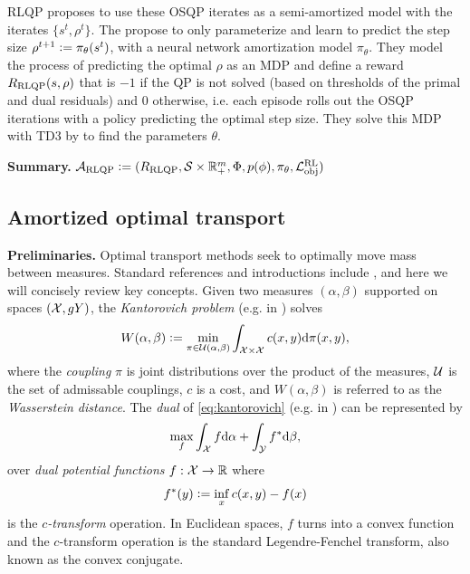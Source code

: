 \documentclass[twoside,11pt]{article}
\newcommand{\eg}{e.g.\xspace}
\newcommand{\ie}{i.e.\xspace}
\begin{document}
RLQP proposes to use these OSQP iterates as a
semi-amortized model with the iterates
$\{s^t, \rho^t\}$. The propose to only parameterize and
learn to predict the step size
$\rho^{t+1}\vcentcolon= \pi_\theta(s^t)$, with a
neural network amortization model $\pi_\theta$.
They model the process of predicting the optimal $\rho$ as
an MDP and define a reward $R_{\rm RLQP}(s, \rho)$ that
is $-1$ if the QP is not solved
(based on thresholds of the primal and dual residuals)
and $0$ otherwise, \ie each episode rolls
out the OSQP iterations with a policy predicting
the optimal step size.
They solve this MDP with TD3 by \citet{fujimoto2018td3}
to find the parameters $\theta$.

\textbf{Summary.}
${\mathcal{A}}_{\rm RLQP}\vcentcolon= (R_{\rm RLQP}, {\mathcal{S}}\times\mathbb{R}^m_+, \Phi, p(\phi), \pi_\theta, {\mathcal{L}}^{\rm RL}_{\rm obj})$


\subsection{Amortized optimal transport}
\label{sec:apps:ot}
\textbf{Preliminaries.}
Optimal transport methods seek to optimally move mass between measures.
Standard references and introductions include
\citet{villani2009optimal,santambrogio2015optimal,peyre2019computational},
and here we will concisely review key concepts.
Given two measures $(\alpha, \beta)$ supported on spaces $({\mathcal{X}}, gY)$,
the \emph{Kantorovich problem} (\eg in \citet[Remark~2.13]{peyre2019computational})
solves
\begin{equation}
  W(\alpha, \beta)\vcentcolon= \min_{\pi\in{\mathcal{U}}(\alpha, \beta)} \int_{{\mathcal{X}}\times {\mathcal{X}}} c(x,y){\rm d}\pi(x,y),
  \label{eq:kantorovich}
\end{equation}
where the \emph{coupling} $\pi$ is joint distributions over the product of the measures,
${\mathcal{U}}$ is the set of admissable couplings,
$c$ is a cost, and
$W(\alpha, \beta)$ is referred to as the \emph{Wasserstein distance}.
The \emph{dual} of \cref{eq:kantorovich} (\eg in \citet[Eq.~2.31]{peyre2019computational})
can be represented by
\begin{equation}
  \max_{f} \int_{\mathcal{X}} f{\rm d}\alpha + \int_{\mathcal{Y}} f^* {\rm d}\beta,
  \label{eq:kantorovich-dual}
\end{equation}
over \emph{dual potential functions} $f: {\mathcal{X}} \rightarrow \mathbb{R}$ where
\begin{equation}
  f^*(y)\vcentcolon=\inf_x c(x, y)-f(x)
  \label{eq:c-transform}
\end{equation}
is the \emph{$c$-transform} operation.
In Euclidean spaces, $f$ turns into a convex function and the $c$-transform
operation is the standard Legendre-Fenchel transform, also known as
the convex conjugate.
\end{document}
